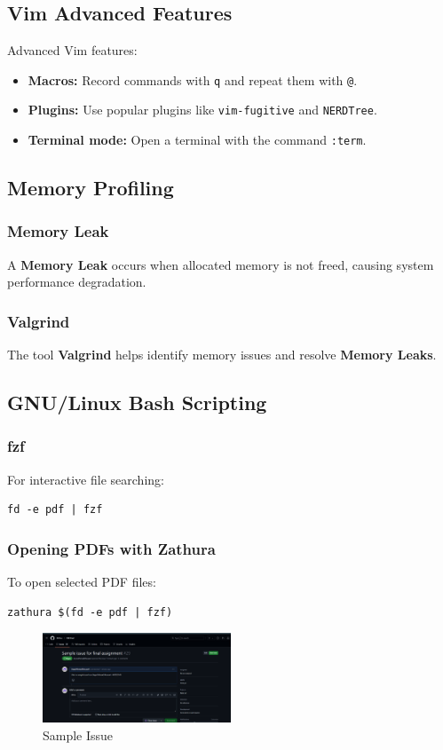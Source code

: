 \documentclass{article}
\begin{document}
\subsection{Vim Advanced Features}
Advanced Vim features:
\begin{itemize}
    \item \textbf{Macros:} Record commands with \texttt{q} and repeat them with \texttt{@}.
    \item \textbf{Plugins:} Use popular plugins like \texttt{vim-fugitive} and \texttt{NERDTree}.
    \item \textbf{Terminal mode:} Open a terminal with the command \texttt{:term}.
\end{itemize}
\subsection{Memory Profiling}
\subsubsection{Memory Leak}
A \textbf{Memory Leak} occurs when allocated memory is not freed, causing system performance degradation.

\subsubsection{Valgrind}
The tool \textbf{Valgrind} helps identify memory issues and resolve \textbf{Memory Leaks}.
\subsection{GNU/Linux Bash Scripting}
\subsubsection{fzf}
For interactive file searching:
\begin{verbatim}
fd -e pdf | fzf
\end{verbatim}

\subsubsection{Opening PDFs with Zathura}
To open selected PDF files:
\begin{verbatim}
zathura $(fd -e pdf | fzf)
\end{verbatim}
\begin{figure}[h!]
    \centering
    \includegraphics[width=0.5\textwidth]{assets/Screenshot 2025-01-15 233322.png}
    \caption{Sample Issue}
    \label{fig:example}
\end{figure}
\end{document}
